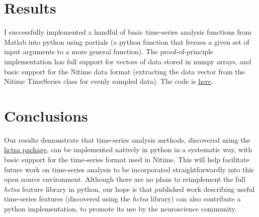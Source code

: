 \documentclass[twocolumn]{bmcart}%
\begin{document}
\section{Results}\label{results}

I successfully implemented a handful of basic time-series analysis
functions from Matlab into python using partials (a python function that
freezes a given set of input arguments to a more general function). The
proof-of-principle implementation has full support for vectors of data
stored in numpy arrays, and basic support for the Nitime data format
(extracting the data vector from the Nitime TimeSeries class for evenly
sampled data). The code is
\href{https://github.com/benfulcher/hctsa_python}{here}.

\section{Conclusions}\label{conclusions}

Our results demonstrate that time-series analysis methods, discovered
using the \href{https://github.com/benfulcher/hctsa}{hctsa package}, can
be implemented natively in python in a systematic way, with basic
support for the time-series format used in Nitime. This will help
facilitate future work on time-series analysis to be incorporated
straightforwardly into this open source environment. Although there are
no plans to reimplement the full \emph{hctsa} feature library in python,
our hope is that published work describing useful time-series features
(discovered using the \emph{hctsa} library) can also contribute a python
implementation, to promote its use by the neuroscience community.

\end{document}
